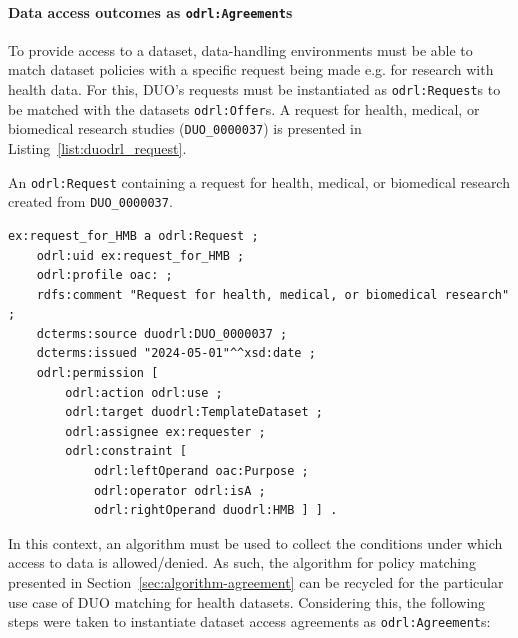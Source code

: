 \paragraph{Data access outcomes as \texttt{odrl:Agreement}s}
To provide access to a dataset, data-handling environments must be able to match dataset policies with a specific request being made e.g. for research with health data.
For this, DUO's requests must be instantiated as \texttt{odrl:Request}s to be matched with the datasets \texttt{odrl:Offer}s.
A request for health, medical, or biomedical research studies (\texttt{DUO\_0000037}) is presented in Listing~\ref{list:duodrl_request}.

\begin{listing}[htp]
\caption{An \texttt{odrl:Request} containing a request for health, medical, or biomedical research created from \texttt{DUO\_0000037}.}
\label{list:duodrl_request}
\begin{verbatim}
ex:request_for_HMB a odrl:Request ;
    odrl:uid ex:request_for_HMB ;
    odrl:profile oac: ;
    rdfs:comment "Request for health, medical, or biomedical research" ;
    dcterms:source duodrl:DUO_0000037 ;
    dcterms:issued "2024-05-01"^^xsd:date ;
    odrl:permission [
        odrl:action odrl:use ;
        odrl:target duodrl:TemplateDataset ;
        odrl:assignee ex:requester ;
        odrl:constraint [
            odrl:leftOperand oac:Purpose ;
            odrl:operator odrl:isA ;
            odrl:rightOperand duodrl:HMB ] ] .
\end{verbatim}
\end{listing}

In this context, an algorithm must be used to collect the conditions under which access to data is allowed/denied.
As such, the algorithm for policy matching presented in Section~\ref{sec:algorithm-agreement} can be recycled for the particular use case of DUO matching for health datasets.
Considering this, the following steps were taken to instantiate dataset access agreements as \texttt{odrl:Agreement}s:

